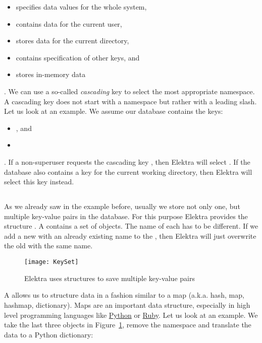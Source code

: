 \begin{itemize}[style=multiline, leftmargin=1.8cm]
  \item [\code{system}] specifies data values for the whole system,
  \item [\code{user}] contains data for the current user,
  \item [\code{dir}] stores data for the current directory,
  \item [\code{spec}] contains specification of other keys, and
  \item [\code{proc}] stores in-memory data
\end{itemize}

. We can use a so-called \emph{cascading} key to select the most appropriate namespace. A cascading key does not start with a namespace but rather with a leading slash. Let us look at an example. We assume our database contains the keys:

\begin{itemize}
  \item {}, and
  \item {}
\end{itemize}

. If a non-superuser requests the cascading key , then Elektra will select . If the database also contains a key  for the current working directory, then Elektra will select this key instead.

\subsection{}
\label{sec:keyset}

As we already saw in the example before, usually we store not only one, but multiple key-value pairs in the database. For this purpose Elektra provides the structure . A  contains a set of  objects. The name of each  has to be different. If we add a new  with an already existing name to the , then Elektra will just overwrite the old  with the same name.

\begin{figure}
  \centering
    \texttt{[image: KeySet]}
  \caption{Elektra uses  structures to save multiple key-value pairs}
  \label{fig:keyset}
\end{figure}

A  allows us to structure data in a fashion similar to a map (a.k.a. hash, map, hashmap, dictionary). Maps are an important data structure, especially in high level programming languages like \href{https://www.python.org}{Python} or \href{https://www.ruby-lang.org}{Ruby}. Let us look at an example. We take the last three  objects in Figure~\ref{fig:keyset}, remove the namespace and translate the data to a Python dictionary:

